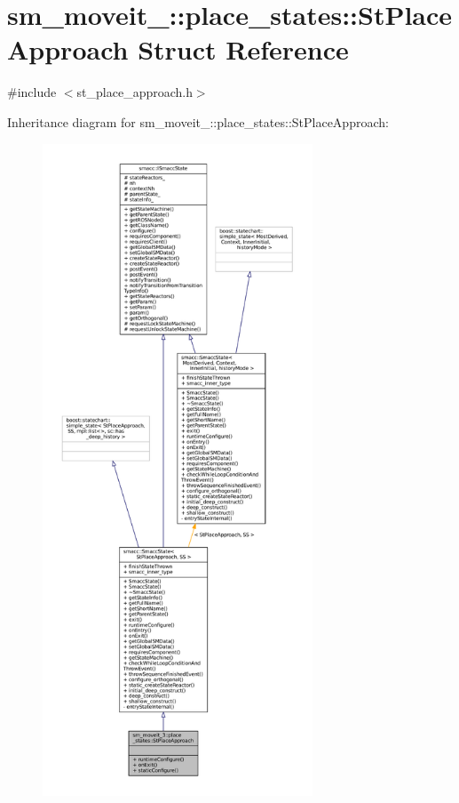 \hypertarget{structsm__moveit__3_1_1place__states_1_1StPlaceApproach}{}\section{sm\+\_\+moveit\+\_\+:\+:place\+\_\+states\+:\+:St\+Place\+Approach Struct Reference}
\label{structsm__moveit__3_1_1place__states_1_1StPlaceApproach}


{\ttfamily \#include $<$st\+\_\+place\+\_\+approach.\+h$>$}



Inheritance diagram for sm\+\_\+moveit\+\_\+:\+:place\+\_\+states\+:\+:St\+Place\+Approach\+:
\nopagebreak
\begin{figure}[H]
\begin{center}
\leavevmode
\includegraphics[height=550pt]{structsm__moveit__3_1_1place__states_1_1StPlaceApproach__inherit__graph}
\end{center}
\end{figure}


